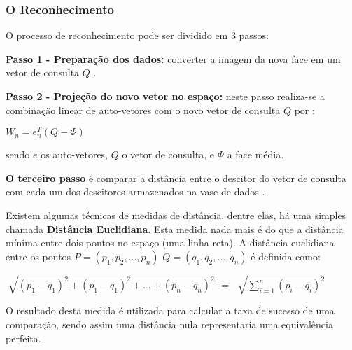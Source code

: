 \subsubsection{O Reconhecimento}\label{subsec:reconhecimento}

O processo de reconhecimento pode ser dividido em 3 passos:

\textbf{Passo 1 - Preparação dos dados:} converter a imagem da nova face em um vetor de consulta $Q$ \cite{geysilva}.


\textbf{Passo 2 - Projeção do novo vetor no espaço:} neste passo realiza-se a combinação linear de auto-vetores com o novo vetor de consulta $Q$ por \cite{geysilva}:
\begin{center}
	$W_n = {e^T_n} (Q - \Phi)$
\end{center}
sendo $e$ os auto-vetores, $Q$ o vetor de consulta, e $\Phi$ a face média.

\textbf{O terceiro passo} é comparar a distância entre o descitor do vetor de consulta com cada um dos descitores armazenados na vase de dados \cite{geysilva}. 


Existem algumas técnicas de medidas de distância, dentre elas, há uma simples chamada \textbf{Distância Euclidiana}. Esta medida nada mais é do que a distância mínima entre dois pontos no espaço (uma linha reta). A distância euclidiana entre os pontos $P = (p_1, p_2, ..., p_n)$ $Q = (q_1, q_2, ..., q_n)$ é definida como:

\begin{center}
	$\sqrt[]{(p_1 - q_1)^2 + (p_1 - q_1)^2 + ... + (p_n - q_n)^2}$ $=$ $\sqrt[]{ \sum_{i=1}^{n} (p_i - q_i)^2 }$ 
\end{center}

O resultado desta medida é utilizada para calcular a taxa de sucesso de uma comparação, sendo assim uma distância nula representaria uma equivalência perfeita.


